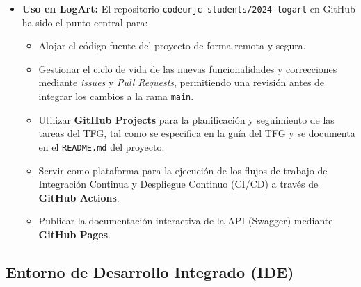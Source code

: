 \begin{itemize}
\begin{itemize}
                \item \textbf{Uso en LogArt:} El repositorio \texttt{codeurjc-students/2024-logart} en GitHub ha sido el punto central para:
                    \begin{itemize}
                        \item Alojar el código fuente del proyecto de forma remota y segura.
                        \item Gestionar el ciclo de vida de las nuevas funcionalidades y correcciones mediante \textit{issues} y \textit{Pull Requests}, permitiendo una revisión antes de integrar los cambios a la rama \texttt{main}.
                        \item Utilizar \textbf{GitHub Projects} para la planificación y seguimiento de las tareas del TFG, tal como se especifica en la guía del TFG y se documenta en el \texttt{README.md} del proyecto.
                        \item Servir como plataforma para la ejecución de los flujos de trabajo de Integración Continua y Despliegue Continuo (CI/CD) a través de \textbf{GitHub Actions}.
                        \item Publicar la documentación interactiva de la API (Swagger) mediante \textbf{GitHub Pages}.
                    \end{itemize}
            \end{itemize}
    \end{itemize}

\subsection{Entorno de Desarrollo Integrado (IDE)}
\label{sec:ide}

